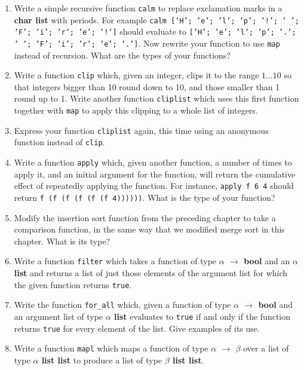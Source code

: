 \documentclass[]{book}
\begin{document}
\begin{enumerate}
  \item Write a simple recursive function \texttt{calm} to replace exclamation marks in a \textbf{\textsf{char list}} with periods. For example \texttt{calm ['H'; 'e'; 'l'; 'p'; '!'; ' '; 'F'; 'i'; 'r'; 'e'; '!']} should evaluate to \texttt{['H'; 'e'; 'l'; 'p'; '.'; ' '; 'F'; 'i'; 'r'; 'e'; '.']}. Now rewrite your function to use \texttt{map} instead of recursion. What are the types of your functions?
  \item Write a function \texttt{clip} which, given an integer, clips it to the range $1\ldots 10$ so that integers bigger than 10 round down to 10, and those smaller than 1 round up to 1. Write another function \texttt{cliplist} which uses this first function together with \texttt{map} to apply this clipping to a whole list of integers.
  \item Express your function \texttt{cliplist} again, this time using an anonymous function instead of \texttt{clip}.
  \item Write a function \texttt{apply} which, given another function, a number of times to apply it, and an initial argument for the function, will return the cumulative effect of repeatedly applying the function. For instance, \texttt{apply f 6 4} should return \texttt{f (f (f (f (f (f 4))))))}. What is the type of your function?
  \item Modify the insertion sort function from the preceding chapter to take a comparison function, in the same way that we modified merge sort in this chapter. What is its type?
  \item Write a function \texttt{filter} which takes a function of type \textbf{\textsf{$\alpha$ $\rightarrow$ bool}} and an \textsf{\textbf{$\alpha$ list}} and returns a list of just those elements of the argument list for which the given function returns \texttt{true}.
  \item Write the function \texttt{for\_all} which, given a function of type \textbf{\textsf{$\alpha$ $\rightarrow$ bool}} and an argument list of type \textsf{\textbf{$\alpha$ list}} evaluates to \texttt{true} if and only if the function returns \texttt{true} for every element of the list. Give examples of its use.
  \item Write a function \texttt{mapl} which maps a function of type \textbf{\textsf{$\alpha$ $\rightarrow$ $\beta$}} over a list of type \textbf{\textsf{$\alpha$ list list}} to produce a list of type \textbf{\textsf{$\beta$ list list}}.
\end{enumerate}
\end{document}
